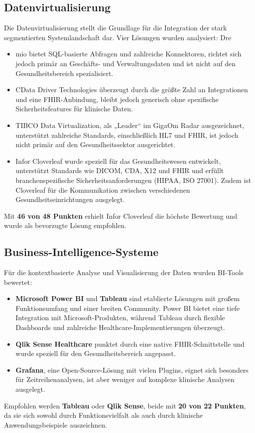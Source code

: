 \subsection{Datenvirtualisierung}
Die Datenvirtualisierung stellt die Grundlage für die Integration der stark segmentierten Systemlandschaft dar. Vier Lösungen wurden analysiert:
Dre\begin{itemize}
	\item mio bietet SQL-basierte Abfragen und zahlreiche Konnektoren, richtet sich jedoch primär an Geschäfts- und Verwaltungsdaten und ist nicht auf den Gesundheitsbereich spezialisiert.
	\item CData Driver Technologies überzeugt durch die größte Zahl an Integrationen und eine FHIR-Anbindung, bleibt jedoch generisch ohne spezifische Sicherheitsfeatures für klinische Daten.
	\item TIBCO Data Virtualization, als „Leader“ im GigaOm Radar ausgezeichnet, unterstützt zahlreiche Standards, einschließlich HL7 und FHIR, ist jedoch nicht primär auf den Gesundheitssektor ausgerichtet.
	\item Infor Cloverleaf wurde speziell für das Gesundheitswesen entwickelt, unterstützt Standards wie DICOM, CDA, X12 und FHIR und erfüllt branchenspezifische Sicherheitsanforderungen (HIPAA, ISO 27001). Zudem ist Cloverleaf für die Kommunikation zwischen verschiedenen Gesundheitseinrichtungen ausgelegt.
\end{itemize}
Mit \textbf{46 von 48 Punkten} erhielt Infor Cloverleaf die höchste Bewertung und wurde als bevorzugte Lösung empfohlen.

\subsection{Business-Intelligence-Systeme}
Für die kontextbasierte Analyse und Visualisierung der Daten wurden BI-Tools bewertet:
\begin{itemize}
	\item \textbf{Microsoft Power BI} und \textbf{Tableau} sind etablierte Lösungen mit großem Funktionsumfang und einer breiten Community. Power BI bietet eine tiefe Integration mit Microsoft-Produkten, während Tableau durch flexible Dashboards und zahlreiche Healthcare-Implementierungen überzeugt.
	\item \textbf{Qlik Sense Healthcare} punktet durch eine native FHIR-Schnittstelle und wurde speziell für den Gesundheitsbereich angepasst.
	\item \textbf{Grafana}, eine Open-Source-Lösung mit vielen Plugins, eignet sich besonders für Zeitreihenanalysen, ist aber weniger auf komplexe klinische Analysen ausgelegt.
\end{itemize}Empfohlen werden \textbf{Tableau} oder \textbf{Qlik Sense}, beide mit \textbf{20 von 22 Punkten}, da sie sich sowohl durch Funktionsvielfalt als auch durch klinische Anwendungsbeispiele auszeichnen.

